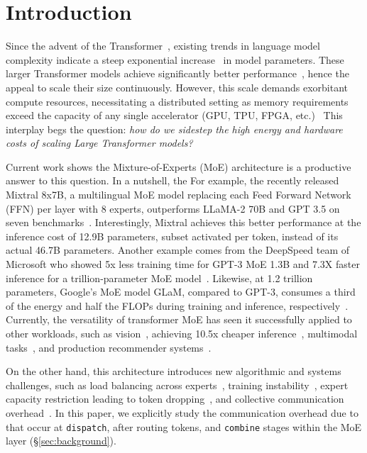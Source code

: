 
\section{Introduction}\label{sec:introduction}
Since the advent of the Transformer~\cite{NEURIPS2017_3f5ee243}, existing trends in language model complexity
indicate a steep exponential increase~\cite{DBLP:journals/corr/abs-2201-11990} in model parameters.
These larger Transformer models achieve significantly better performance~\cite{DBLP:journals/corr/abs-2005-14165},
hence the appeal to scale their size continuously.
However, this scale demands exorbitant compute resources,
necessitating a distributed setting as memory requirements exceed the capacity of any
single accelerator (GPU, TPU, FPGA, etc.)~\cite{DBLP:journals/corr/abs-2201-11990}
This interplay begs the question:
\emph{how do we sidestep the high energy and hardware costs of scaling Large Transformer models?}

Current work shows the Mixture-of-Experts (MoE) architecture is a productive answer to this question.
In a nutshell, the
For example, the recently released Mixtral 8x7B, a multilingual MoE model replacing each Feed Forward Network (FFN) per layer
with 8 experts, outperforms LLaMA-2 70B and GPT 3.5 on seven benchmarks~\cite{mixtral8x7B}.
Interestingly, Mixtral achieves this better performance at the inference cost of 12.9B parameters,
subset activated per token, instead of its actual 46.7B parameters.
Another example comes from the DeepSpeed team of Microsoft who showed 5x less training time for GPT-3 MoE 1.3B and
7.3X faster inference for a trillion-parameter MoE model~\cite{pmlr-v162-rajbhandari22a}.
Likewise, at 1.2 trillion parameters, Google's MoE model GLaM, compared to GPT-3,
consumes a third of the energy and half the FLOPs during training and inference, respectively~\cite{pmlr-v162-du22c}.
Currently, the versatility of transformer MoE has seen it successfully applied to other workloads,
such as vision~\cite{NEURIPS2021_48237d9f}, achieving 10.5x cheaper inference~\cite{puigcerver2023sparse},
multimodal tasks~\cite{NEURIPS2022_3e67e84a}, and production recommender systems~\cite{DBLP:journals/corr/abs-2108-04690}.

On the other hand, this architecture introduces new algorithmic and systems challenges,
such as load balancing across experts~\cite{ShazeerMMDLHD17}, training instability~\cite{NEURIPS2022_3e67e84a},
expert capacity restriction leading to token dropping~\cite{gale2022megablocks},
and collective communication overhead~\cite{DBLP:journals/corr/abs-2006-16668}.
In this paper, we explicitly study the communication overhead due to \ata that occur
at \verb|dispatch|, after routing tokens, and \verb|combine| stages within the MoE layer (\S \ref{sec:background}).

